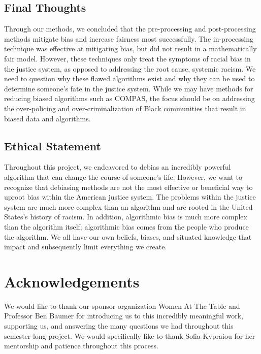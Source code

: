 \documentclass[,article,,moreauthors,pdftex]{mdpi}
\begin{document}
\hypertarget{final-thoughts}{%
\subsection{Final Thoughts}\label{final-thoughts}}

Through our methods, we concluded that the pre-processing and
post-processing methods mitigate bias and increase fairness most
successfully. The in-processing technique was effective at mitigating
bias, but did not result in a mathematically fair model. However, these
techniques only treat the symptoms of racial bias in the justice system,
as opposed to addressing the root cause, systemic racism. We need to
question why these flawed algorithms exist and why they can be used to
determine someone's fate in the justice system. While we may have
methods for reducing biased algorithms such as COMPAS, the focus should
be on addressing the over-policing and over-criminalization of Black
communities that result in biased data and algorithms.

\hypertarget{ethical-statement}{%
\subsection{Ethical Statement}\label{ethical-statement}}

Throughout this project, we endeavored to debias an incredibly powerful
algorithm that can change the course of someone's life. However, we want
to recognize that debiasing methods are not the most effective or
beneficial way to uproot bias within the American justice system. The
problems within the justice system are much more complex than an
algorithm and are rooted in the United States's history of racism. In
addition, algorithmic bias is much more complex than the algorithm
itself; algorithmic bias comes from the people who produce the
algorithm. We all have our own beliefs, biases, and situated knowledge
that impact and subsequently limit everything we create.

\hypertarget{acknowledgements}{%
\section{Acknowledgements}\label{acknowledgements}}

We would like to thank our sponsor organization Women At The Table and
Professor Ben Baumer for introducing us to this incredibly meaningful
work, supporting us, and answering the many questions we had throughout
this semester-long project. We would specifically like to thank Sofia
Kypraiou for her mentorship and patience throughout this process.
\end{document}
